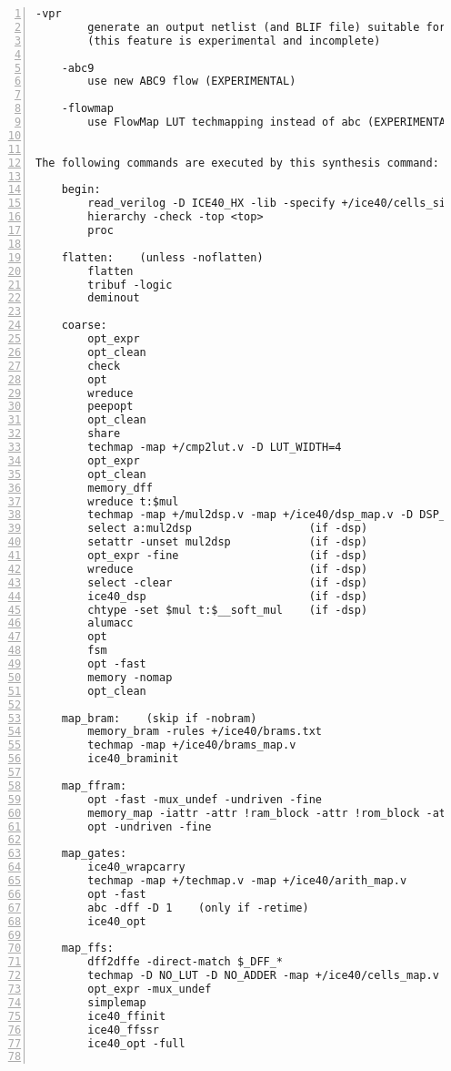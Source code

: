\begin{lstlisting}[numbers=left,frame=single]
    -vpr
        generate an output netlist (and BLIF file) suitable for VPR
        (this feature is experimental and incomplete)

    -abc9
        use new ABC9 flow (EXPERIMENTAL)

    -flowmap
        use FlowMap LUT techmapping instead of abc (EXPERIMENTAL)


The following commands are executed by this synthesis command:

    begin:
        read_verilog -D ICE40_HX -lib -specify +/ice40/cells_sim.v
        hierarchy -check -top <top>
        proc

    flatten:    (unless -noflatten)
        flatten
        tribuf -logic
        deminout

    coarse:
        opt_expr
        opt_clean
        check
        opt
        wreduce
        peepopt
        opt_clean
        share
        techmap -map +/cmp2lut.v -D LUT_WIDTH=4
        opt_expr
        opt_clean
        memory_dff
        wreduce t:$mul
        techmap -map +/mul2dsp.v -map +/ice40/dsp_map.v -D DSP_A_MAXWIDTH=16 -D DSP_B_MAXWIDTH=16 -D DSP_A_MINWIDTH=2 -D DSP_B_MINWIDTH=2 -D DSP_Y_MINWIDTH=11 -D DSP_NAME=$__MUL16X16    (if -dsp)
        select a:mul2dsp                  (if -dsp)
        setattr -unset mul2dsp            (if -dsp)
        opt_expr -fine                    (if -dsp)
        wreduce                           (if -dsp)
        select -clear                     (if -dsp)
        ice40_dsp                         (if -dsp)
        chtype -set $mul t:$__soft_mul    (if -dsp)
        alumacc
        opt
        fsm
        opt -fast
        memory -nomap
        opt_clean

    map_bram:    (skip if -nobram)
        memory_bram -rules +/ice40/brams.txt
        techmap -map +/ice40/brams_map.v
        ice40_braminit

    map_ffram:
        opt -fast -mux_undef -undriven -fine
        memory_map -iattr -attr !ram_block -attr !rom_block -attr logic_block -attr syn_ramstyle=auto -attr syn_ramstyle=registers -attr syn_romstyle=auto -attr syn_romstyle=logic
        opt -undriven -fine

    map_gates:
        ice40_wrapcarry
        techmap -map +/techmap.v -map +/ice40/arith_map.v
        opt -fast
        abc -dff -D 1    (only if -retime)
        ice40_opt

    map_ffs:
        dff2dffe -direct-match $_DFF_*
        techmap -D NO_LUT -D NO_ADDER -map +/ice40/cells_map.v
        opt_expr -mux_undef
        simplemap
        ice40_ffinit
        ice40_ffssr
        ice40_opt -full


\end{lstlisting}
